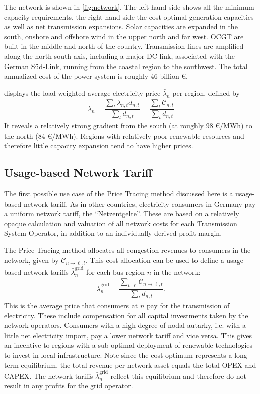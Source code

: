 \documentclass[11pt,twocolumn]{article}
\newcommand{\lmp}[1][n]{\lambda_{#1,t}}
\newcommand{\averagelmp}[1][n]{\bar{\lambda}_{#1}}
\newcommand{\demand}[1][n]{d_{#1,t}}
\newcommand{\cost}{\mathcal{C}}
\newcommand{\payment}[1][n]{\cost_{#1,t}}
\newcommand{\allocatelinecost}[1][n \rightarrow \ell]{\cost_{#1, t}}
\begin{document}
The network is shown in  \cref{fig:network}. The left-hand side shows all the minimum capacity requirements, the right-hand side the cost-optimal generation capacities as well as net transmission expansions. Solar capacities are expanded in the south, onshore and offshore wind in the upper north and far west. \ac{OCGT} are built in the middle and north of the country. Transmission lines are amplified along the north-south axis, including a major \ac{DC} link, associated with the German S\"ud-Link, running from the coastal region to the southwest. 
The total annualized cost of the power system is roughly 46 billion \euro.
% 

 displays the load-weighted average electricity price $\averagelmp$ per region, defined by 
\begin{align}
    \averagelmp = \dfrac{\sum_{t} \lmp \demand}{\sum_t \demand} = \dfrac{\sum_{t} \payment }{\sum_t \demand}    
\end{align}
It reveals a relatively strong gradient from the south (at roughly 98 \euro/MWh) to the north (84 \euro/MWh). Regions with relatively poor renewable resources and therefore little capacity expansion tend to have higher prices. 
 \\
 
\subsection{Usage-based Network Tariff}

The first possible use case of the Price Tracing method discussed here is a usage-based network tariff. As in other countries, electricity consumers in Germany pay a uniform network tariff, the ``Netzentgelte''. These are based on a relatively opaque calculation and valuation of all network costs for each Transmission System Operator, in addition to an individually derived profit margin. 

The Price Tracing method allocates all congestion revenues to consumers in the network, given by $\allocatelinecost$. This cost allocation can be used to define a usage-based network tariffs $\averagelmp^\text{grid}$ for each bus-region $n$ in the network:     
\begin{align}
    \averagelmp^\text{grid} = \dfrac{\sum_{t,\ell} \allocatelinecost}{\sum_t \demand}.
\end{align}
This is the average price that consumers at $n$ pay for the transmission of electricity. These include compensation for all capital investments taken by the network operators. Consumers with a high degree of nodal autarky, i.e. with a little net electricity import, pay a lower network tariff and vice versa. This gives an incentive to regions with a sub-optimal deployment of renewable technologies to invest in local infrastructure. Note since the cost-optimum represents a long-term equilibrium, the total revenue per network asset equals the total \ac{OPEX} and \ac{CAPEX}. The network tariffs $\averagelmp^\text{grid}$ reflect this equilibrium and therefore do not result in any profits for the grid operator.
\end{document}

